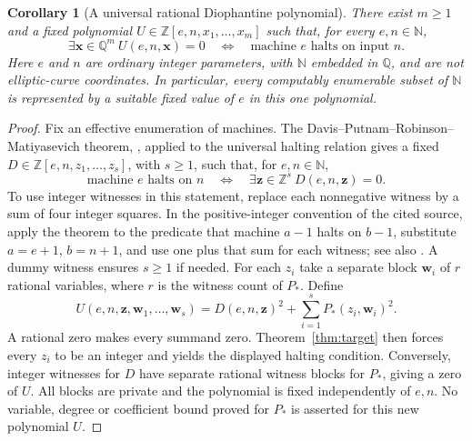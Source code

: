 \documentclass[11pt]{article}
\newtheorem{corollary}[theorem]{Corollary}
\theoremstyle{definition}
\theoremstyle{remark}
\newcommand{\Q}{\mathbb Q}
\newcommand{\Z}{\mathbb Z}
\newcommand{\N}{\mathbb N}
\begin{document}
\begin{corollary}[A universal rational Diophantine polynomial]
\label{cor:rational-universal}
There exist $m\ge1$ and a fixed polynomial
$U\in\Z[e,n,x_1,\ldots,x_m]$ such that, for every $e,n\in\N$,
\[
 \exists\mathbf x\in\Q^m\ U(e,n,\mathbf x)=0
 \quad\Longleftrightarrow\quad
 \text{machine $e$ halts on input $n$}.
\]
Here $e$ and $n$ are ordinary integer parameters, with $\N$ embedded
in $\Q$, and are not elliptic-curve coordinates. In particular, every
computably enumerable subset of $\N$ is represented by a suitable
fixed value of $e$ in this one polynomial.
\end{corollary}
\begin{proof}
Fix an effective enumeration of machines. The Davis--Putnam--Robinson--Matiyasevich theorem, \cite[Basic Theorem, p.~3]{matiyasevich1971},
applied to the universal halting relation gives a fixed
$D\in\Z[e,n,z_1,\ldots,z_s]$, with $s\ge1$, such that, for $e,n\in\N$,
\[
 \text{machine $e$ halts on $n$}
 \quad\Longleftrightarrow\quad
 \exists\mathbf z\in\Z^s\ D(e,n,\mathbf z)=0.
\]
To use integer witnesses in this statement, replace each nonnegative
witness by a sum of four integer squares. In the positive-integer
convention of the cited source, apply the theorem to the predicate
that machine $a-1$ halts on $b-1$, substitute $a=e+1$, $b=n+1$,
and use one plus that sum for each witness; see also
\cite[p.~2]{matiyasevich1971}. A dummy witness ensures $s\ge1$ if needed.
For each $z_i$ take a separate block $\mathbf w_i$ of $r$ rational
variables, where $r$ is the witness count of $P_*$. Define
\[
 U(e,n,\mathbf z,\mathbf w_1,\ldots,\mathbf w_s)
   =D(e,n,\mathbf z)^2+\sum_{i=1}^s P_*(z_i,\mathbf w_i)^2.
\]
A rational zero makes every summand zero. Theorem~\ref{thm:target}
then forces every $z_i$ to be an integer and yields the displayed
halting condition. Conversely, integer witnesses for $D$ have separate
rational witness blocks for $P_*$, giving a zero of $U$. All blocks
are private and the polynomial is fixed independently of $e,n$.
No variable, degree or coefficient bound proved for $P_*$ is asserted
for this new polynomial $U$.
\end{proof}
\end{document}
